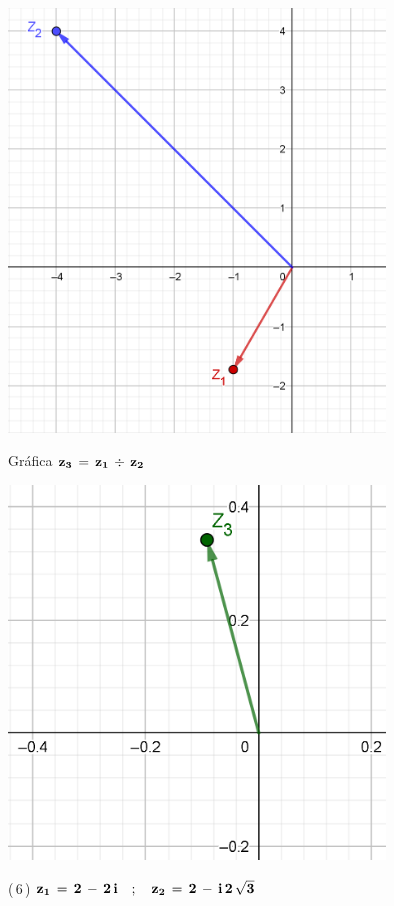 \documentclass[a4paper,11pt,openany]{book}
\begin{document}
\begin{center}
    \includegraphics[width=10cm]{Gra-Ej-5-1.png}
\end{center}

\textcolor{ao(english)}{} Gráfica $\bf{z_{3}\,=\,z_{1}\,\div\,z_{2}}$

\begin{center}
    \includegraphics[width=10cm]{Gra-Ej-5-2.png}
\end{center}

\textcolor{ao(english)}{(\,6\,)} $\bf{z_{1}\,=\,2\,-\,2\,i \quad;\quad z_{2}\,=\,2\,-\,i\,2\,\sqrt{3}}$
\end{document}
